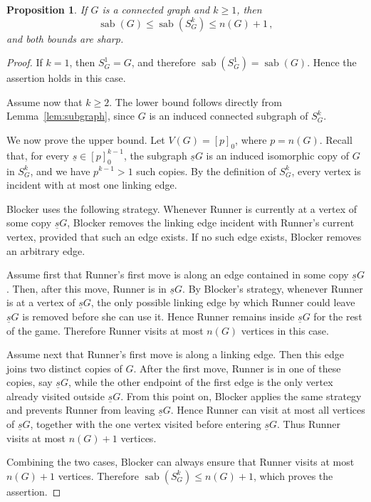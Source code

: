 \documentclass[12pt]{article}
\newtheorem{proposition}[theorem]{Proposition}
\DeclareMathOperator{\sab}{\mathrm{sab}}
\begin{document}
\begin{proposition}
\label{prp:generalized-sierpinski-bounds}
If $G$ is a connected graph and $k \geq 1$, then 
$$\sab(G) \leq \sab(S^k_G) \leq n(G)+1\, ,$$
and both bounds are sharp.
\end{proposition}

\begin{proof}
If $k=1$, then $S^1_G=G$, and therefore $\sab(S_G^1)=\sab(G)$. Hence the assertion holds in this case.

Assume now that $k\ge 2$. The lower bound follows directly from Lemma~\ref{lem:subgraph}, since
$G$ is an induced connected subgraph of $S_G^k$.

We now prove the upper bound. Let $V(G)=[p]_0$, where $p=n(G)$. Recall that, for every
$\underline{s}\in[p]_0^{k-1}$, the subgraph $\underline{s}G$ is an induced isomorphic copy of $G$ in $S_G^k$, and we have $p^{k-1} > 1$ such copies. By the definition of $S_G^k$, every vertex is incident with at most one linking edge.

Blocker uses the following strategy. Whenever Runner is currently at a vertex
of some copy $\underline{s}G$, Blocker removes the linking edge incident with
Runner's current vertex, provided that such an edge exists. If no such edge exists,
Blocker removes an arbitrary edge.

Assume first that Runner's first move is along an edge contained in some copy
$\underline{s}G$. Then, after this move, Runner is in $\underline{s}G$. By Blocker's
strategy, whenever Runner is at a vertex of $\underline{s}G$, the only possible linking edge by which Runner could leave $\underline{s}G$ is removed before she can use it. Hence Runner remains inside $\underline{s}G$ for the rest of the game. Therefore
Runner visits at most $n(G)$ vertices in this case.

Assume next that Runner's first move is along a linking edge. Then this edge
joins two distinct copies of $G$. After the first move, Runner is in one of these
copies, say $\underline{s}G$, while the other endpoint of the first edge is the only
vertex already visited outside $\underline{s}G$. From this point on, Blocker applies
the same strategy and prevents Runner from leaving $\underline{s}G$. Hence Runner
can visit at most all vertices of $\underline{s}G$, together with the one vertex
visited before entering $\underline{s}G$. Thus Runner visits at most $n(G)+1$
vertices.

Combining the two cases, Blocker can always ensure that Runner visits at most
$n(G)+1$ vertices. Therefore $\sab(S_G^k)\le n(G)+1$, which proves the assertion.


\end{proof}
\end{document}
